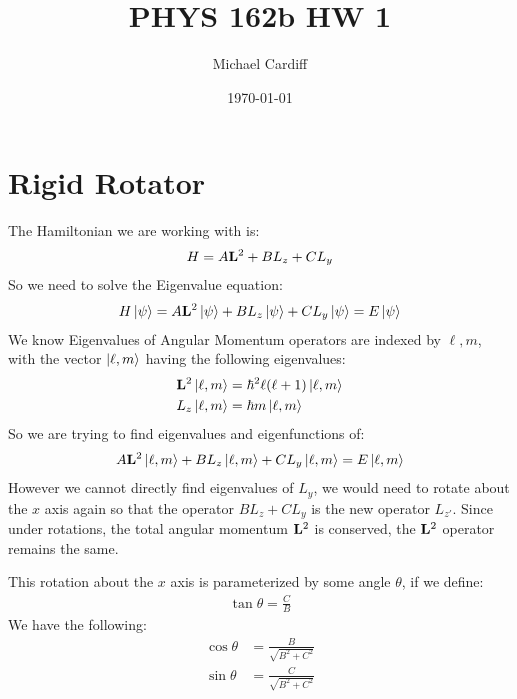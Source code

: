 \documentclass[12pt]{article}
\title{\vspace{-3em}PHYS 162b HW 1}
\author{Michael Cardiff}
\date{\today}
\renewcommand{\l}{\ell}
\begin{document}
\maketitle
\section{Rigid Rotator}
The Hamiltonian we are working with is:
\begin{align*}
  H=A\vb{L}^2+BL_z+CL_y
\end{align*}
So we need to solve the Eigenvalue equation:
\begin{align*}
  H\ket{\psi}=A\vb{L}^2\ket{\psi}+BL_z\ket{\psi}+CL_y\ket{\psi}=E\ket{\psi}
\end{align*}
We know Eigenvalues of Angular Momentum operators are indexed by $\ell,m$, with the vector $\ket{\ell,m}$ having the following eigenvalues:
\begin{align*}
  \vb{L}^2\ket{\l,m}&=\hbar^2\l(\l+1)\ket{\l,m}\\
  L_z\ket{\l,m}&=\hbar m\ket{\l,m}
\end{align*}
So we are trying to find eigenvalues and eigenfunctions of:
\begin{align*}
  A\vb{L}^2\ket{\l,m}+BL_z\ket{\l,m}+CL_y\ket{\l,m}=E\ket{\l,m}
\end{align*}
However we cannot directly find eigenvalues of $L_y$, we would need to rotate about the $x$ axis again so that the operator $BL_z+CL_y$ is the new operator $L_{z'}$. Since under rotations, the total angular momentum $\vb{L}^2$ is conserved, the $\vb{L}^2$ operator remains the same.

This rotation about the $x$ axis is parameterized by some angle $\theta$, if we define:
\begin{align*}
  \tan\theta=\frac{C}{B}
\end{align*}
We have the following:
\begin{align*}
  \cos\theta&=\frac{B}{\sqrt{B^2+C^2}}\\
  \sin\theta&=\frac{C}{\sqrt{B^2+C^2}}
\end{align*}
\end{document}
